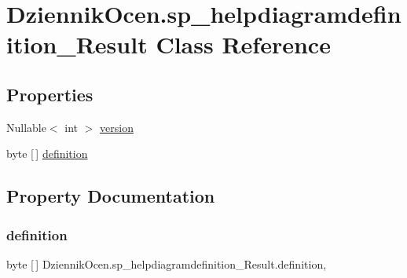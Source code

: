 \hypertarget{class_dziennik_ocen_1_1sp__helpdiagramdefinition___result}{}\section{Dziennik\+Ocen.\+sp\+\_\+helpdiagramdefinition\+\_\+\+Result Class Reference}
\label{class_dziennik_ocen_1_1sp__helpdiagramdefinition___result}
\subsection*{Properties}
\begin{DoxyCompactItemize}
\item 
Nullable$<$ int $>$ \hyperlink{class_dziennik_ocen_1_1sp__helpdiagramdefinition___result_a8afb8aff3d7c8bd2fb9e2ab0a33ddfd9}{version}
\item 
byte \mbox{[}$\,$\mbox{]} \hyperlink{class_dziennik_ocen_1_1sp__helpdiagramdefinition___result_aeb3844959694204a5e753404f4bc178f}{definition}
\end{DoxyCompactItemize}


\subsection{Property Documentation}
\mbox{\label{class_dziennik_ocen_1_1sp__helpdiagramdefinition___result_aeb3844959694204a5e753404f4bc178f}} 
\subsubsection{\texorpdfstring{definition}{definition}}
{\footnotesize\ttfamily byte \mbox{[}$\,$\mbox{]} Dziennik\+Ocen.\+sp\+\_\+helpdiagramdefinition\+\_\+\+Result.\+definition\hspace{0.3cm}{\ttfamily [get]}, {\ttfamily [set]}}

